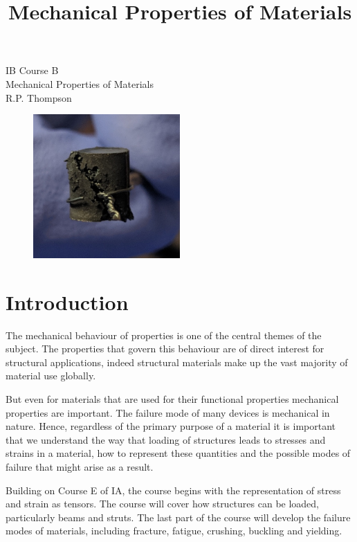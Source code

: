 \documentclass[a4paper]{article}
\title{Mechanical Properties of Materials}
\begin{document}
{\centering
{\Huge
IB Course B\\
Mechanical Properties of Materials\\}
\vspace{1cm}
{\LARGE
R.P. Thompson\\}

\vspace{3cm}
\begin{figure}[h!]
\centering
\includegraphics[width=0.5\textwidth]{crushed}
\end{figure}
}

\clearpage


\onehalfspacing
\section*{Introduction}

The mechanical behaviour of properties is one of the central themes of the subject. The properties that govern this behaviour are of direct interest for structural applications, indeed structural materials make up the vast majority of material use globally.

But even for materials that are used for their functional properties mechanical properties are important. The failure mode of many devices is mechanical in nature. Hence, regardless of the primary purpose of a material it is important that we understand the way that loading of structures leads to stresses and strains in a material, how to represent these quantities and the possible modes of failure that might arise as a result.

Building on Course E of IA, the course begins with the representation of stress and strain as tensors. The course will cover how structures can be loaded, particularly beams and struts. The last part of the course will develop the failure modes of materials, including fracture, fatigue, crushing, buckling and yielding.





\clearpage

\tableofcontents

\clearpage
{}











\FloatBarrier
\clearpage
\printbibliography
\end{document}
